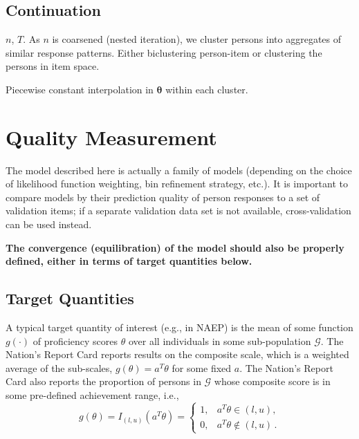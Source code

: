 \documentclass{article}
\newcommand{\G}{\mathcal{G}}
\newcommand{\ta}{\theta}
\newcommand{\bta}{\boldsymbol\ta}
\begin{document}
\subsection{Continuation}
$n$, $T$. As $n$ is coarsened (nested iteration), we cluster persons into aggregates of similar
response patterns. Either biclustering person-item or clustering the persons in item space.


Piecewise constant interpolation in $\bta$ within each cluster.

\section{Quality Measurement}
The model described here is actually a family of models (depending on the choice of likelihood function weighting, bin refinement strategy, etc.). It is important to compare models by their prediction quality of
person responses to a set of validation items; if a separate validation data set is not available, cross-validation can be used instead.

{\bf The convergence (equilibration) of the model should also be properly defined, either in terms of target quantities below.}

\subsection{Target Quantities}
A typical target quantity of interest (e.g., in NAEP) is the mean of some function $g(\cdot)$ of proficiency scores $\ta$ over all individuals in some sub-population $\G$. The Nation's Report Card reports results on the composite scale, which is a weighted average of the sub-scales, $g(\ta) = a^T \ta$ for some fixed $a$. The Nation's Report Card also reports the proportion of persons in $\G$ whose composite score is in some pre-defined achievement range, i.e.,
\begin{equation}
	g(\ta) = I_{(l,u)}(a^T \ta) =
  \begin{cases}
    1, & a^T \ta \in (l,u), \\
    0, & a^T \ta \not \in (l,u)\,.
  \end{cases}
\end{equation}
\end{document}

